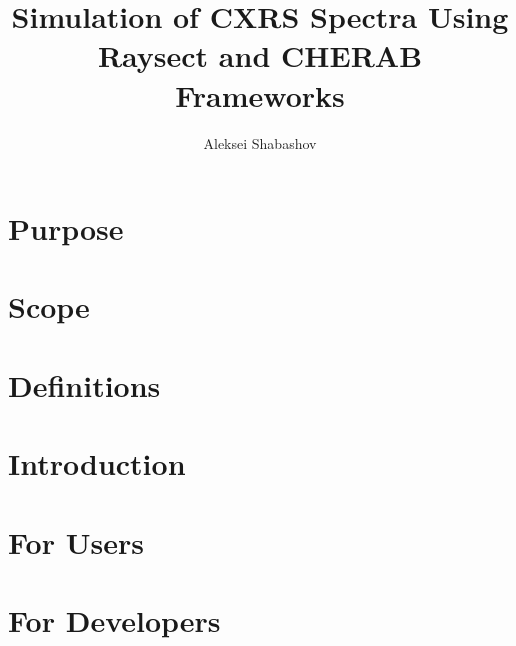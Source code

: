 \documentclass[a4paper,12pt,oneside,english]{article} %
\title{Simulation of CXRS Spectra Using Raysect and CHERAB Frameworks}
\author{Aleksei Shabashov}
\date{}
\begin{document}
\section{Purpose}


\section{Scope}


\section{Definitions}

\section{Introduction}


\section{For Users}



\section{For Developers}


\printbibliography%
\end{document}
